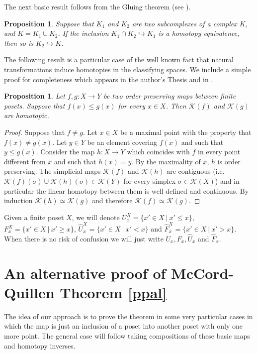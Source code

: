 \documentclass[11pt,twoside]{amsart}
\theoremstyle{plain}
\newtheorem{prop}[lema]{Proposition}
\theoremstyle{remark}
\theoremstyle{definition}
\newcommand{\kp}{\mathcal{K}}
\begin{document}
The next basic result follows from the Gluing theorem (see \cite{Bro}).

\begin{prop} \label{push}
Suppose that $K_1$ and $K_2$ are two subcomplexes of a complex $K$, and $K=K_1\cup K_2$. If the inclusion $K_1\cap K_2 \hookrightarrow K_1$ is a homotopy equivalence, then so is $K_2\hookrightarrow K$.  
\end{prop}

The following result is a particular case of the well known fact that natural transformations induce homotopies in the classifying spaces. We include a simple proof for completeness which appears in the author's Thesis \cite[Proposition 2.1.2]{Bar3} and in \cite{BM2}. 

\begin{prop} \label{lema1}
Let $f,g:X\to Y$ be two order preserving maps between finite posets. Suppose that $f(x)\le g(x)$ for every $x\in X$. Then $\kp (f)$ and $\kp (g)$ are homotopic.
\end{prop}
\begin{proof}
Suppose that $f\neq g$. Let $x\in X$ be a maximal point with the property that $f(x)\neq g(x)$. Let $y\in Y$ be an element covering $f(x)$ and such that $y\le g(x)$. Consider the map $h:X\to Y$ which coincides with $f$ in every point different from $x$ and such that $h(x)=y$. By the maximality of $x$, $h$ is order preserving. The simplicial maps $\kp (f)$ and $\kp (h)$ are contiguous (i.e. $\kp (f)(\sigma)\cup \kp (h)(\sigma)\in \kp (Y)$ for every simplex $\sigma \in \kp (X)$) and in particular the linear homotopy between them is well defined and continuous. By induction $\kp (h)\simeq \kp (g)$ and therefore $\kp (f)\simeq \kp (g)$.  
\end{proof}


Given a finite poset $X$, we will denote $U^X_x=\{x' \in X \ | \ x'\le x \}$, $F^X_x=\{x' \in X \ | \ x'\ge x \}$, $\hat{U}^X_x=\{x' \in X \ | \ x'< x \}$ and $\hat{F}^X_x=\{x' \in X \ | \ x'> x \}$. When there is no risk of confusion we will just write $U_x, F_x, \hat{U}_x$ and $\hat{F}_x$. 

\section{An alternative proof of McCord-Quillen Theorem \ref{ppal}}
The idea of our approach is to prove the theorem in some very particular cases in which the map is just an inclusion of a poset into another poset with only one more point. The general case will follow taking compositions of these basic maps and homotopy inverses.   
\end{document}
